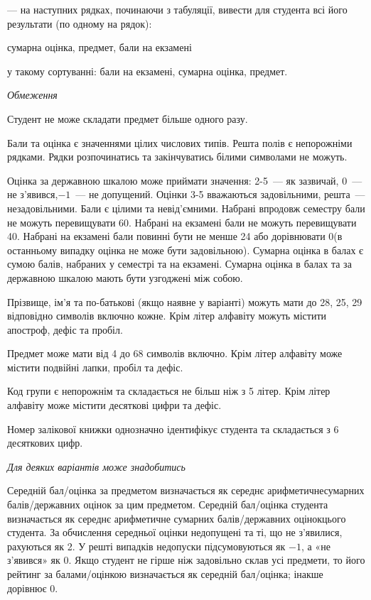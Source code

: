 \documentclass[11pt, ukrainian]{article}
\begin{document}
{\noindent}--- на наступних рядках, починаючи з табуляції, вивести для студента всі його результати (по одному на рядок):\par
сумарна оцінка, предмет, бали на екзамені

{\noindent}у такому сортуванні: бали на екзамені, сумарна оцінка, предмет.


\bigskip\textit{Обмеження}

Студент не може складати предмет більше одного разу.

Бали та оцінка є значеннями цілих числових типів. Решта полів є непорожніми рядками.
Рядки розпочинатись та закінчуватись білими символами не можуть.

Оцінка за державною шкалою може приймати значення: 2-5~--- як зазвичай, 0~--- не з’явився,$-1$~--- не допущений. 
Оцінки 3-5 вважаються задовільними, решта~--- незадовільними. 
Бали є цілими та невід’ємними.
Набрані впродовж семестру бали не можуть перевищувати 60. 
Набрані на екзамені бали не можуть перевищувати 40. 
Набрані на екзамені бали повинні бути не менше 24 або дорівнювати 0(в останньому випадку оцінка не може бути задовільною). 
Сумарна оцінка в балах є сумою балів, набраних у семестрі та на екзамені.
Сумарна оцінка в балах та за державною шкалою мають бути узгоджені між собою.

Прізвище, ім’я та по-батькові (якщо наявне у варіанті) можуть мати до 28, 25, 29 відповідно символів включно кожне. 
Крім літер алфавіту можуть містити апостроф, дефіс та пробіл.

Предмет може мати від 4 до 68 символів включно. 
Крім літер алфавіту може містити подвійні лапки, пробіл та дефіс.

Код групи є непорожнім та складається не більш ніж з 5 літер. 
Крім літер алфавіту може містити десяткові цифри та дефіс.


Номер залікової книжки однозначно ідентифікує студента та складається з 6 десяткових цифр. 

\bigskip\textit{Для деяких варіантів може знадобитись}

Середній бал/оцінка за предметом визначається як середнє арифметичнесумарних балів/державних оцінок за цим предметом. 
Середній бал/оцінка студента визначається як середнє арифметичне сумарних балів/державних оцінокцього студента. 
За обчислення середньої оцінки недопущені та ті, що не з’явилися, рахуються як 2.
У решті випадків недопуски підсумовуються як $-1$, а «не з’явився» як 0.
Якщо студент не гірше ніж задовільно склав усі предмети, 
то його рейтинг за балами/оцінкою визначається як середній бал/оцінка; інакше дорівнює 0.
\end{document}

